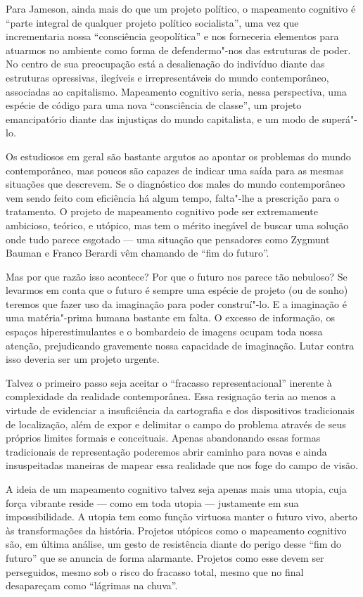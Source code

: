 Para Jameson, ainda mais do que um projeto político, o mapeamento
cognitivo é ``parte integral de qualquer projeto político socialista'',
uma vez que incrementaria nossa ``consciência geopolítica'' e nos
forneceria elementos para atuarmos no ambiente como forma de
defendermo"-nos das estruturas de poder. No centro de sua preocupação
está a desalienação do indivíduo diante das estruturas opressivas,
ilegíveis e irrepresentáveis do mundo contemporâneo, associadas ao
capitalismo. Mapeamento cognitivo seria, nessa perspectiva, uma espécie
de código para uma nova ``consciência de classe'', um projeto
emancipatório diante das injustiças do mundo capitalista, e um modo de
superá"-lo.

Os estudiosos em geral são bastante argutos ao apontar os problemas do
mundo contemporâneo, mas poucos são capazes de indicar uma saída para as
mesmas situações que descrevem. Se o diagnóstico dos males do mundo
contemporâneo vem sendo feito com eficiência há algum tempo, falta"-lhe a
prescrição para o tratamento. O projeto de mapeamento cognitivo pode ser
extremamente ambicioso, teórico, e utópico, mas tem o mérito inegável de
buscar uma solução onde tudo parece esgotado --- uma situação que
pensadores como Zygmunt Bauman e Franco Berardi vêm chamando de ``fim do
futuro''.

Mas por que razão isso acontece? Por que o futuro nos parece tão
nebuloso? Se levarmos em conta que o futuro é sempre uma espécie de
projeto (ou de sonho) teremos que fazer uso da imaginação para poder
construí"-lo. E a imaginação é uma matéria"-prima humana bastante em
falta. O excesso de informação, os espaços hiperestimulantes e o
bombardeio de imagens ocupam toda nossa atenção, prejudicando gravemente
nossa capacidade de imaginação. Lutar contra isso deveria ser um projeto
urgente.

Talvez o primeiro passo seja aceitar o ``fracasso representacional''
inerente à complexidade da realidade contemporânea. Essa resignação
teria ao menos a virtude de evidenciar a insuficiência da cartografia e
dos dispositivos tradicionais de localização, além de expor e delimitar
o campo do problema através de seus próprios limites formais e
conceituais. Apenas abandonando essas formas tradicionais de
representação poderemos abrir caminho para novas e ainda insuspeitadas
maneiras de mapear essa realidade que nos foge do campo de visão.

A ideia de um mapeamento cognitivo talvez seja apenas mais uma utopia,
cuja força vibrante reside --- como em toda utopia --- justamente em sua
impossibilidade. A utopia tem como função virtuosa manter o futuro vivo,
aberto às transformações da história. Projetos utópicos como o
mapeamento cognitivo são, em última análise, um gesto de resistência
diante do perigo desse ``fim do futuro'' que se anuncia de forma
alarmante. Projetos como esse devem ser perseguidos, mesmo sob o risco
do fracasso total, mesmo que no final desapareçam como ``lágrimas na
chuva''.


